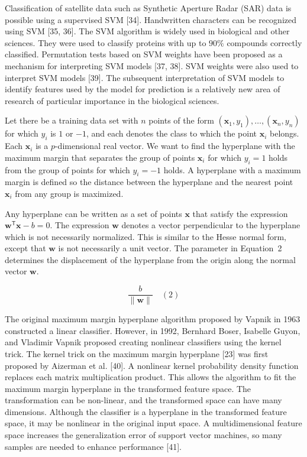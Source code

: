 \documentclass[preprint,12pt]{elsarticle}
\begin{document}
Classification of satellite data such as Synthetic Aperture Radar (SAR) data is possible using a supervised SVM [34]. Handwritten characters can be recognized using SVM [35, 36]. The SVM algorithm is widely used in biological and other sciences. They were used to classify proteins with up to $90\%$ compounds correctly classified. Permutation tests based on SVM weights have been proposed as a mechanism for interpreting SVM models [37, 38]. SVM weights were also used to interpret SVM models [39]. The subsequent interpretation of SVM models to identify features used by the model for prediction is a relatively new area of research of particular importance in the biological sciences.

Let there be a training data set with $n$ points of the form $(\mathbf{x}_{1},y_{1}),\ldots,(\mathbf{x}_{n},y_{n})$ for which $y_{i}$ is $1$ or $-1$, and each denotes the class to which the point $\mathbf{x}_{i}$ belongs. Each $\mathbf{x}_{i}$ is a $p$-dimensional real vector. We want to find the hyperplane with the maximum margin that separates the group of points $\mathbf{x}_{i}$ for which $y_{i}=1$ holds from the group of points for which $y_{i}=-1$ holds. A hyperplane with a maximum margin is defined so the distance between the hyperplane and the nearest point $\mathbf{x}_{i}$ from any group is maximized.

Any hyperplane can be written as a set of points $\mathbf{x}$ that satisfy the expression $\mathbf{w}^{\mathsf{T}}\mathbf{x} -b=0$. The expression $\mathbf{w}$ denotes a vector perpendicular to the hyperplane which is not necessarily normalized. This is similar to the Hesse normal form, except that $\mathbf{w}$ is not necessarily a unit vector. The parameter in Equation~2 determines the displacement of the hyperplane from the origin along the normal vector $\mathbf{w}$.

\begin{equation}
	\frac{b}{\|\mathbf{w} \|}
	\quad\left(2\right)
\end{equation}

The original maximum margin hyperplane algorithm proposed by Vapnik in 1963 constructed a linear classifier. However, in 1992, Bernhard Boser, Isabelle Guyon, and Vladimir Vapnik proposed creating nonlinear classifiers using the kernel trick. The kernel trick on the maximum margin hyperplane [23] was first proposed by Aizerman et al. [40]. A nonlinear kernel probability density function replaces each matrix multiplication product. This allows the algorithm to fit the maximum margin hyperplane in the transformed feature space. The transformation can be non-linear, and the transformed space can have many dimensions. Although the classifier is a hyperplane in the transformed feature space, it may be nonlinear in the original input space. A multidimensional feature space increases the generalization error of support vector machines, so many samples are needed to enhance performance [41]. 
\end{document}
